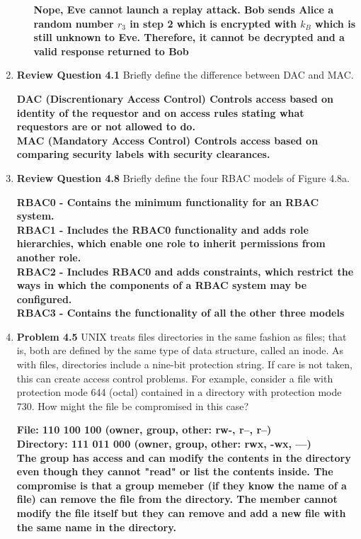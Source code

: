 \documentclass[12pt]{article}
\begin{document}
\begin{enumerate}
\begin{enumerate}
  \textbf{Nope, Eve cannot launch a replay attack. Bob sends Alice a random number $r_3$ in step 2 which is encrypted with $k_B$ which is still unknown to Eve. Therefore, it cannot be decrypted and a valid response returned to Bob}

\end{enumerate}

\item \textbf{Review Question 4.1} Briefly define the difference between DAC and MAC.

\textbf{DAC (Discrentionary Access Control) Controls access based on identity of the requestor and on access rules stating what requestors are or not allowed to do.}\\
\textbf{MAC (Mandatory Access Control) Controls access based on comparing security labels with security clearances.}\\


\item \textbf{Review Question 4.8} Briefly define the four RBAC models of Figure 4.8a.

\textbf{RBAC0 - Contains the minimum functionality for an RBAC system.}\\
\textbf{RBAC1 - Includes the RBAC0 functionality and adds role hierarchies, which enable one role to inherit permissions from another role.}\\
\textbf{RBAC2 - Includes RBAC0 and adds constraints, which restrict the ways in which the components of a RBAC system may be configured.}\\
\textbf{RBAC3 - Contains the functionality of all the other three models}\\


\item \textbf{Problem 4.5} UNIX treats files directories in the same fashion as files; that is, both are defined by the same type of data structure, called an inode. As with files, directories include a nine-bit protection string. If care is not taken, this can create access control problems. For example, consider a file with protection mode 644 (octal) contained in a directory with protection mode 730. How might the file be compromised in this case?

\textbf{File: 110 100 100 (owner, group, other: rw-, r--, r--)} \\
\textbf{Directory: 111 011 000 (owner, group, other: rwx, -wx, ---)} \\

\textbf{The group has access and can modify the contents in the directory even though they cannot "read" or list the contents inside. The compromise is that a group memeber (if they know the name of a file) can remove the file from the directory. The member cannot modify the file itself but they can remove and add a new file with the same name in the directory.} \\



\end{enumerate}
\end{document}
